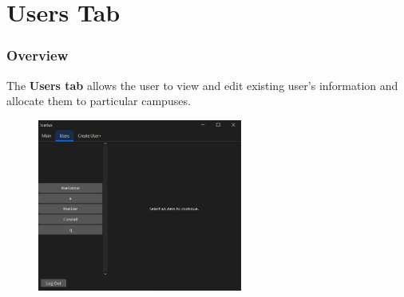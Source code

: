 \section{Users Tab}
\subsubsection{Overview}
The \textbf{Users tab} allows the user to view and edit existing user's information and allocate them to particular campuses. 

\begin{figure}[H]
    \centering
    \includegraphics[width=0.6\textwidth]{UsersTab/usersTabOverview.PNG}
\end{figure}

